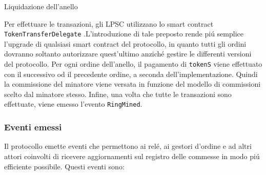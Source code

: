 \documentclass[UTF8,nofonts]{article}
\makeatletter
\newenvironment{figurehere}
 {\def\@captype{figure}}
 {}
\makeatother
\begin{document}
\begin{multicols}{2}
\begin{center}
\begin{figurehere}
\centering
{}
\caption{Liquidazione dell'anello}
\label{fig:settlement}
\end{figurehere}
\end{center}

Per effettuare le transazioni, gli LPSC utilizzano lo smart contract \verb|TokenTransferDelegate| .L'introduzione di tale preposto rende pi\'u semplice l'upgrade di qualsiasi smart contract del protocollo, in quanto tutti gli ordini dovranno soltanto autorizzare quest'ultimo anzich\'e gestire le differenti versioni del protocollo.
Per ogni ordine dell'anello, il pagamento di \verb|tokenS| viene effettuato con il successivo od il precedente ordine, a seconda dell'implementazione. Quindi la commissione del minatore viene versata in funzione del modello di commissioni scelto dal minatore stesso. Infine, una volta che tutte le transazioni sono effettuate, viene emesso l'evento \verb|RingMined|.

\subsubsection{Eventi emessi\label{sec:events}}

Il protocollo emette eventi che permettono ai rel\'e, ai gestori d'ordine e ad altri attori coinvolti di ricevere aggiornamenti sul registro delle commesse in modo pi\'u efficiente possibile. Questi eventi sono:


\end{multicols}
\end{document}
